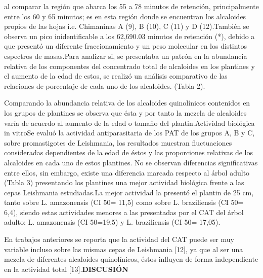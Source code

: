 \documentclass{article}
\begin{document}
{al comparar la región que abarca los 55 a 78 minutos de retención, principalmente entre los 60 y 65 minutos; es en esta región donde se encuentran los alcaloides propios de las hojas i.e. Chimaninas A (9), B (10), C (11) y D (12).}{También se observa un pico inidentificable a los 62,690.03 minutos de retención (*), debido a que presentó un diferente fraccionamiento y un peso molecular en los distintos espectros de masas.}{Para analizar si, se presentaba un patrón en la abundancia relativa de los componentes del concentrado total de alcaloides en los plantines y el aumento de la edad de estos, se realizó un análisis comparativo de las relaciones de porcentaje de cada uno de los alcaloides. (Tabla 2).}\begin{Center}\end{Center}{Comparando la abundancia relativa de los alcaloides quinolínicos contenidos en los grupos de plantines se observa que ésta y por tanto la mezcla de alcaloides varía de acuerdo al aumento de la edad o tamaño del plantin.}{Actividad biológica in vitro}{Se evaluó la actividad antiparasitaria de los PAT de los grupos A, B y C, sobre promastigotes de Leishmania, los resultados muestran fluctuaciones consideradas dependientes de la edad de éstos y las proporciones relativas de los alcaloides en cada uno de estos plantines. No se observan diferencias significativas entre ellos, sin embargo, existe una diferencia marcada respecto al árbol adulto (Tabla 3) presentando los plantines una mejor actividad biológica frente a las cepas Leishmania estudiadas.}{La mejor actividad la presentó el plantin de 25 cm, tanto sobre L. amazonensis (CI 50= 11,5) como sobre L. braziliensis (CI 50= 6,4), siendo estas actividades menores a las presentadas por el CAT del árbol adulto: L. amazonensis (CI 50=19,5) y L. braziliensis (CI 50= 17,05).}\begin{Center}\end{Center}{En trabajos anteriores se reporta que la actividad del CAT puede ser muy variable incluso sobre las mismas cepas de Leishmania [12], ya que al ser una mezcla de diferentes alcaloides quinolínicos, éstos influyen de forma independiente en la actividad total [13].}{\renewcommand{\children}{DISCUSIÓN}\textbf{\children}
}
\end{document}

